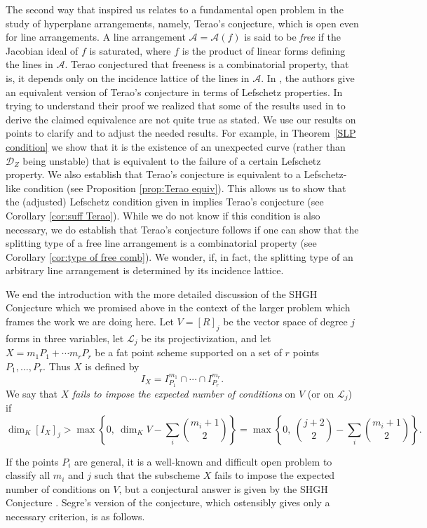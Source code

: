\documentclass[12pt]{amsart}
\numberwithin{equation}{section}
\theoremstyle{definition}
\begin{document}
The second way that \cite{DIV} inspired us relates to a fundamental open problem in the study of hyperplane arrangements, namely, Terao's conjecture, which is open even for line arrangements. A line arrangement ${\mathcal{A}} = {\mathcal{A}} (f)$ is said to be \emph{free} if the Jacobian ideal of $f$ is saturated, where $f$ is the product of linear forms defining the lines in ${\mathcal{A}}$. Terao conjectured that freeness is a combinatorial property, that is, it depends only on the incidence lattice of the lines in ${\mathcal{A}}$. In \cite{DIV}, the authors give an equivalent version of Terao's conjecture in terms of Lefschetz properties. 
In trying to understand their proof we realized that some of the results used in \cite{DIV} to derive the claimed equivalence are not quite true as stated. We use our results on points to clarify and to adjust the needed results. For example, in Theorem~\ref{SLP condition} we show that it is the existence of an unexpected curve (rather than ${\mathcal{D}}_Z$ being unstable) that is equivalent to the failure of a certain Lefschetz property. We also establish that Terao's conjecture is equivalent to a Lefschetz-like condition (see Proposition \ref{prop:Terao equiv}). This allows us to show that the (adjusted) Lefschetz condition given in \cite{DIV} implies Terao's conjecture (see Corollary \ref{cor:suff Terao}). While we do not know if this condition is also necessary,  
we do establish that Terao's conjecture follows if one can show that the splitting type of a free line arrangement is a combinatorial property (see Corollary \ref{cor:type of free comb}). We wonder, if, in fact, the splitting type of an arbitrary line arrangement is determined by its incidence lattice. 
\smallskip 

We end the introduction with the more detailed discussion of the SHGH Conjecture which we promised above
in the context of the larger problem which frames the work we are doing here. 
Let $V = [R]_j$ be the vector space of degree $j$ forms in three variables, let $\mathcal L_j$ be its projectivization, and let $X = m_1 P_1 + \cdots m_r P_r$ be a fat point scheme supported on a set of $r$ points $P_1,\ldots,P_r$. Thus $X$ is defined by 
\[
I_X = I_{P_1}^{m_1} \cap \cdots \cap I_{P_r}^{m_r}.
\]
We say that $X$ {\it fails to impose the expected number of conditions} on $V$ (or on $\mathcal L_j$) if
\[
\dim_K [I_X]_j > \max \left \{0, \ \dim_K V - \sum_i \binom{m_i+1}{2} \right \} = 
\max \left \{0, \ \binom{j+2}{2}  - \sum_i \binom{m_i+1}{2} \right \}. 
\]

If the points $P_i$ are general, it is a well-known and difficult 
open problem to classify all $m_i$ and $j$ such that the subscheme
$X$ fails to impose the expected number of conditions on $V$, but a conjectural 
answer is given by the SHGH Conjecture \cite{segre, Ha1, G, Hi}. Segre's
version of the conjecture, which ostensibly gives only
a necessary criterion, is as follows.
\smallskip
\end{document}
